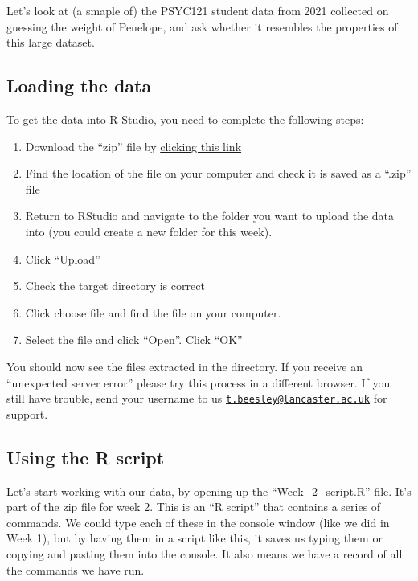 \documentclass[
]{book}
\providecommand{\tightlist}{%
  \setlength{\itemsep}{0pt}\setlength{\parskip}{0pt}}
\begin{document}
Let's look at (a smaple of) the PSYC121 student data from 2021 collected on guessing the weight of Penelope, and ask whether it resembles the properties of this large dataset.

\hypertarget{uploading_zip}{%
\subsection{Loading the data}\label{uploading_zip}}

To get the data into R Studio, you need to complete the following steps:

\begin{enumerate}
\def\labelenumi{\arabic{enumi}.}
\tightlist
\item
  Download the ``zip'' file by \href{files/Week_2/Week_2.zip}{clicking this link}
\item
  Find the location of the file on your computer and check it is saved as a ``.zip'' file
\item
  Return to RStudio and navigate to the folder you want to upload the data into (you could create a new folder for this week).
\item
  Click ``Upload''
\item
  Check the target directory is correct
\item
  Click choose file and find the file on your computer.
\item
  Select the file and click ``Open''. Click ``OK''
\end{enumerate}

You should now see the files extracted in the directory. If you receive an ``unexpected server error'' please try this process in a different browser. If you still have trouble, send your username to us \href{mailto:t.beesley@lancaster.ac.uk}{\nolinkurl{t.beesley@lancaster.ac.uk}} for support.

\hypertarget{basic_script}{%
\subsection{Using the R script}\label{basic_script}}

Let's start working with our data, by opening up the ``Week\_2\_script.R'' file. It's part of the zip file for week 2. This is an ``R script'' that contains a series of commands. We could type each of these in the console window (like we did in Week 1), but by having them in a script like this, it saves us typing them or copying and pasting them into the console. It also means we have a record of all the commands we have run.
\end{document}
